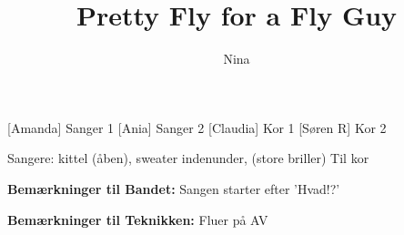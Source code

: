 \documentclass[a4paper,11pt]{article}
\title{Pretty Fly for a Fly Guy}
\author{Nina}
\begin{document}
\maketitle

\begin{roles}
    [Amanda] Sanger 1
 [Ania] Sanger 2
 [Claudia] Kor 1
 [Søren R] Kor 2
\end{roles}

\begin{props}
     Sangere: kittel (åben), sweater indenunder, (store briller)
     Til kor
\end{props}

\textbf{Bemærkninger til Bandet:} Sangen starter efter 'Hvad!?'

\textbf{Bemærkninger til Teknikken:} Fluer på AV
\end{document}
